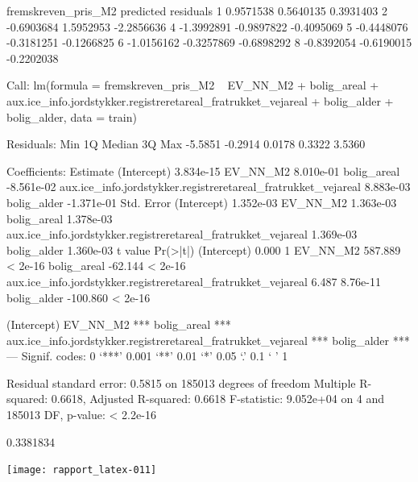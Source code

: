 \documentclass{report}
\begin{document}
\begin{Schunk}
\begin{Soutput}
  fremskreven_pris_M2  predicted  residuals
1           0.9571538  0.5640135  0.3931403
2          -0.6903684  1.5952953 -2.2856636
4          -1.3992891 -0.9897822 -0.4095069
5          -0.4448076 -0.3181251 -0.1266825
6          -1.0156162 -0.3257869 -0.6898292
8          -0.8392054 -0.6190015 -0.2202038
\end{Soutput}
\begin{Soutput}
Call:
lm(formula = fremskreven_pris_M2 ~ EV_NN_M2 + bolig_areal + aux.ice_info.jordstykker.registreretareal_fratrukket_vejareal + 
    bolig_alder + bolig_alder, data = train)

Residuals:
    Min      1Q  Median      3Q     Max 
-5.5851 -0.2914  0.0178  0.3322  3.5360 

Coefficients:
                                                                Estimate
(Intercept)                                                    3.834e-15
EV_NN_M2                                                       8.010e-01
bolig_areal                                                   -8.561e-02
aux.ice_info.jordstykker.registreretareal_fratrukket_vejareal  8.883e-03
bolig_alder                                                   -1.371e-01
                                                              Std. Error
(Intercept)                                                    1.352e-03
EV_NN_M2                                                       1.363e-03
bolig_areal                                                    1.378e-03
aux.ice_info.jordstykker.registreretareal_fratrukket_vejareal  1.369e-03
bolig_alder                                                    1.360e-03
                                                               t value Pr(>|t|)
(Intercept)                                                      0.000        1
EV_NN_M2                                                       587.889  < 2e-16
bolig_areal                                                    -62.144  < 2e-16
aux.ice_info.jordstykker.registreretareal_fratrukket_vejareal    6.487 8.76e-11
bolig_alder                                                   -100.860  < 2e-16
                                                                 
(Intercept)                                                      
EV_NN_M2                                                      ***
bolig_areal                                                   ***
aux.ice_info.jordstykker.registreretareal_fratrukket_vejareal ***
bolig_alder                                                   ***
---
Signif. codes:  0 ‘***’ 0.001 ‘**’ 0.01 ‘*’ 0.05 ‘.’ 0.1 ‘ ’ 1

Residual standard error: 0.5815 on 185013 degrees of freedom
Multiple R-squared:  0.6618,	Adjusted R-squared:  0.6618 
F-statistic: 9.052e+04 on 4 and 185013 DF,  p-value: < 2.2e-16
\end{Soutput}
\begin{Soutput}
[1] 0.3381834
\end{Soutput}
\end{Schunk}
\texttt{[image: rapport\_latex-011]}
\end{document}
